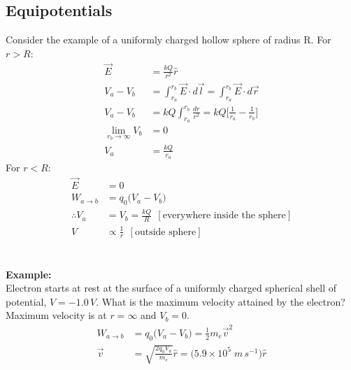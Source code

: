\documentclass[a4paper, 11pt, normalem]{report}
\begin{document}
\section{Equipotentials}
Consider the example of a uniformly charged hollow sphere of radius R.
For $r > R$:
\begin{align}
    \vec{E} &= \frac{kQ}{r^{2}} \hat{r} \\
    V_{a} - V_{b} &= \int_{r_{a}}^{r_{b}} \vec{E} \cdot d\vec{l} = \int_{r_{a}}^{r_{b}} \vec{E} \cdot d\vec{r} \\
    V_{a} - V_{b} &= kQ \int_{r_{a}}^{r_{b}} \frac{dr}{r^{2}} = kQ \Big[ \frac{1}{r_{a}} - \frac{1}{r_{b}} \Big] \\
    \lim_{r_{b} \to \infty} V_{b} &= 0 \\
    V_{a} &= \frac{kQ}{r_{a}}
\end{align}
For $r < R$:
\begin{align}
    \vec{E} &= 0 \\
    W_{a \to b}&= q_{0}\big(V_{a} - V_{b} \big) \\
    \therefore V_{a} &= V_{b} = \frac{kQ}{R} ~~[\text{everywhere inside the sphere}] \\
    V &\propto \frac{1}{r} ~~[\text{outside sphere}]
\end{align}

\chapter{}
\textbf{Example:}\\
Electron starts at rest at the surface of a uniformly charged spherical shell of potential, $V = -1.0\,V$.
What is the maximum velocity attained by the electron?
Maximum velocity is at $r = \infty$ and $V_{b} = 0$.
\begin{align}
    W_{a \to b} &= q_{0} \big(V_{a} - V_{b} \big) = \tfrac{1}{2}m_{e}\vec{v}^{2} \\
    \vec{v} &= \sqrt{\frac{2q_{0}V_{a}}{m_{e}}} \hat{r} = \big(5.9 \times 10^{5} \; m\,s^{-1} \big) \hat{r}
\end{align}
\end{document}
